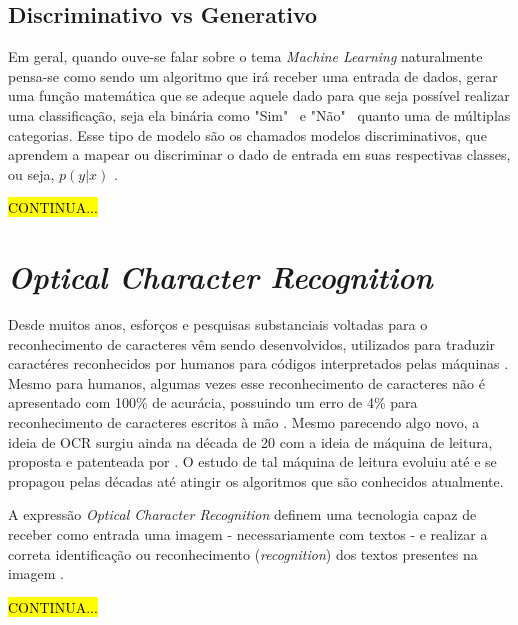 \subsection{Discriminativo vs Generativo} \label{ssec:generative-vs-discriminative}

Em geral, quando ouve-se falar sobre o tema \textit{Machine Learning} naturalmente pensa-se como sendo um algoritmo que irá receber uma entrada de dados, gerar uma função matemática que se adeque aquele dado para que seja possível realizar uma classificação, seja ela binária como "Sim" \  e "Não" \  quanto uma de múltiplas categorias. Esse tipo de modelo são os chamados modelos discriminativos, que aprendem a mapear ou discriminar o dado de entrada em suas respectivas classes, ou seja, \(p(y | x)\) \cite{discriminative-vs-generative}.

\hl{CONTINUA...}

\section{\textit{Optical Character Recognition}}

Desde muitos anos, esforços e pesquisas substanciais voltadas para o reconhecimento de caracteres vêm sendo desenvolvidos, utilizados para traduzir caractéres reconhecidos por humanos para códigos interpretados pelas máquinas \cite{ocr-survey}. Mesmo para humanos, algumas vezes esse reconhecimento de caracteres não é apresentado com 100\% de acurácia, possuindo um erro de 4\% para reconhecimento de caracteres escritos à mão \cite{ocr-on-handprinted}. Mesmo parecendo algo novo, a ideia de OCR surgiu ainda na década de 20 com a ideia de máquina de leitura, proposta e patenteada por . O estudo de tal máquina de leitura evoluiu até e se propagou pelas décadas até atingir os algoritmos que são conhecidos atualmente.

A expressão \textit{Optical Character Recognition} definem uma tecnologia capaz de receber como entrada uma imagem - necessariamente com textos - e realizar a correta identificação ou reconhecimento (\textit{recognition}) dos textos presentes na imagem \cite{ocr-survey}.

\hl{CONTINUA...}